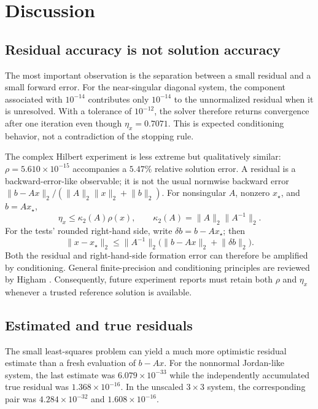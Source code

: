 \section{Discussion}

\subsection{Residual accuracy is not solution accuracy}

The most important observation is the separation between a small residual and a
small forward error. For the near-singular diagonal system, the component
associated with $10^{-14}$ contributes only $10^{-14}$ to the unnormalized
residual when it is unresolved. With a tolerance of $10^{-12}$, the solver
therefore returns convergence after one iteration even though
$\eta_x=0.7071$. This is expected conditioning behavior, not a contradiction of
the stopping rule.

The complex Hilbert experiment is less extreme but qualitatively similar:
$\rho=5.610\times10^{-15}$ accompanies a $5.47\%$ relative solution error. A
residual is a backward-error-like observable; it is not the usual normwise
backward error $\lVert b-Ax\rVert_2/(\lVert A\rVert_2\lVert x\rVert_2+
\lVert b\rVert_2)$. For nonsingular $A$, nonzero $x_\star$, and $b=Ax_\star$,
\begin{equation}
    \eta_x\leq\kappa_2(A)\rho(x),\qquad
    \kappa_2(A)=\lVert A\rVert_2\lVert A^{-1}\rVert_2.
\end{equation}
For the tests' rounded right-hand side, write $\delta b=b-Ax_\star$; then
\begin{equation}
    \lVert x-x_\star\rVert_2\leq\lVert A^{-1}\rVert_2
       \bigl(\lVert b-Ax\rVert_2+\lVert\delta b\rVert_2\bigr).
\end{equation}
Both the residual and right-hand-side formation error can therefore be amplified
by conditioning. General finite-precision and conditioning principles are
reviewed by Higham \cite{higham_2002}. Consequently,
future experiment reports must retain both $\rho$ and $\eta_x$ whenever a trusted
reference solution is available.

\subsection{Estimated and true residuals}

The small least-squares problem can yield a much more optimistic residual estimate
than a fresh evaluation of $b-Ax$. For the nonnormal Jordan-like system, the last
estimate was $6.079\times10^{-33}$ while the independently accumulated true
residual was $1.368\times10^{-16}$. In the unscaled $3\times3$ system, the
corresponding pair was $4.284\times10^{-32}$ and
$1.608\times10^{-16}$.

